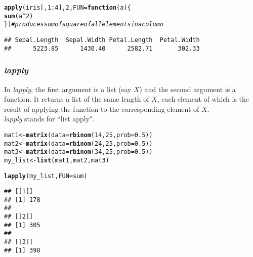 \documentclass[11pt, a4paper]{article}\usepackage[]{graphicx}\usepackage[]{xcolor}
\makeatletter
\newcommand{\hlnum}[1]{\textcolor[rgb]{0.686,0.059,0.569}{#1}}%
\newcommand{\hlcom}[1]{\textcolor[rgb]{0.678,0.584,0.686}{\textit{#1}}}%
\newcommand{\hlopt}[1]{\textcolor[rgb]{0,0,0}{#1}}%
\newcommand{\hldef}[1]{\textcolor[rgb]{0.345,0.345,0.345}{#1}}%
\newcommand{\hlkwa}[1]{\textcolor[rgb]{0.161,0.373,0.58}{\textbf{#1}}}%
\newcommand{\hlkwb}[1]{\textcolor[rgb]{0.69,0.353,0.396}{#1}}%
\newcommand{\hlkwc}[1]{\textcolor[rgb]{0.333,0.667,0.333}{#1}}%
\newcommand{\hlkwd}[1]{\textcolor[rgb]{0.737,0.353,0.396}{\textbf{#1}}}%
\newenvironment{kframe}{%
 \def\at@end@of@kframe{}%
 \ifinner\ifhmode%
  \def\at@end@of@kframe{\end{minipage}}%
  \begin{minipage}{\columnwidth}%
 \fi\fi%
 \def\FrameCommand##1{\hskip\@totalleftmargin \hskip-\fboxsep
 \colorbox{shadecolor}{##1}\hskip-\fboxsep
     \hskip-\linewidth \hskip-\@totalleftmargin \hskip\columnwidth}%
 \MakeFramed {\advance\hsize-\width
   \@totalleftmargin\z@ \linewidth\hsize
   \@setminipage}}%
 {\par\unskip\endMakeFramed%
 \at@end@of@kframe}
\newenvironment{knitrout}{}{} %
\makeatother
\begin{document}
\begin{knitrout}
\color{fgcolor}\begin{kframe}
\begin{alltt}
\hlkwd{apply}\hldef{(iris[,} \hlnum{1}\hlopt{:}\hlnum{4}\hldef{],} \hlnum{2}\hldef{,} \hlkwc{FUN} \hldef{=} \hlkwa{function}\hldef{(}\hlkwc{a}\hldef{) \{}
    \hlkwd{sum}\hldef{(a}\hlopt{^}\hlnum{2}\hldef{)}
\hldef{\})}  \hlcom{# produces sum of square of all elements in a column}
\end{alltt}
\begin{verbatim}
## Sepal.Length  Sepal.Width Petal.Length  Petal.Width 
##      5223.85      1430.40      2582.71       302.33
\end{verbatim}
\end{kframe}
\end{knitrout}

\subsubsection{\textit{lapply}} In \textit{lapply}, the first argument is a list (say $X$) and the second argument is a function. It returns a list of the same length of $X$, each element of which is the result of applying the function to the corresponding element of $X$. \\

\textit{lapply} stands for ``list apply".

\begin{knitrout}
\color{fgcolor}\begin{kframe}
\begin{alltt}
\hldef{mat1} \hlkwb{<-} \hlkwd{matrix}\hldef{(}\hlkwc{data} \hldef{=} \hlkwd{rbinom}\hldef{(}\hlnum{14}\hldef{,} \hlnum{25}\hldef{,} \hlkwc{prob} \hldef{=} \hlnum{0.5}\hldef{))}
\hldef{mat2} \hlkwb{<-} \hlkwd{matrix}\hldef{(}\hlkwc{data} \hldef{=} \hlkwd{rbinom}\hldef{(}\hlnum{24}\hldef{,} \hlnum{25}\hldef{,} \hlkwc{prob} \hldef{=} \hlnum{0.5}\hldef{))}
\hldef{mat3} \hlkwb{<-} \hlkwd{matrix}\hldef{(}\hlkwc{data} \hldef{=} \hlkwd{rbinom}\hldef{(}\hlnum{34}\hldef{,} \hlnum{25}\hldef{,} \hlkwc{prob} \hldef{=} \hlnum{0.5}\hldef{))}
\hldef{my_list} \hlkwb{<-} \hlkwd{list}\hldef{(mat1, mat2, mat3)}

\hlkwd{lapply}\hldef{(my_list,} \hlkwc{FUN} \hldef{= sum)}
\end{alltt}
\begin{verbatim}
## [[1]]
## [1] 178
## 
## [[2]]
## [1] 305
## 
## [[3]]
## [1] 398
\end{verbatim}
\end{kframe}
\end{knitrout}
\end{document}
